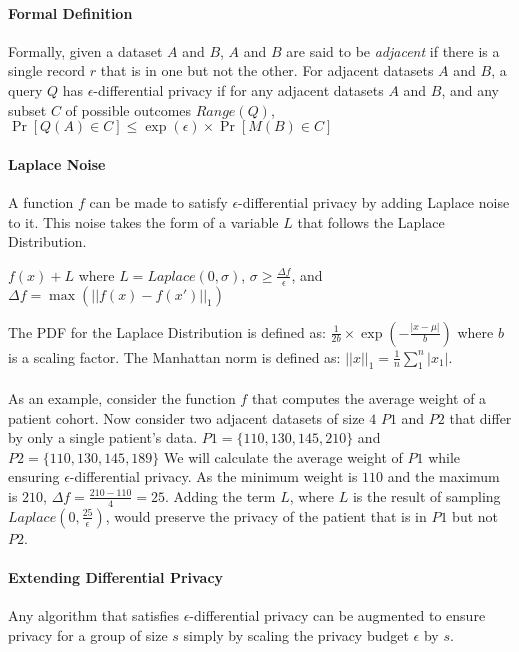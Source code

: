 \paragraph{Formal Definition}
Formally, given a dataset $A$ and $B$, $A$ and $B$ are said to be \textit{adjacent} if there is a single record $r$ that is in one but not the other. For adjacent datasets $A$ and $B$, a query $Q$ has $\epsilon$-differential privacy if for any adjacent datasets $A$ and $B$, and any subset $C$ of possible outcomes $Range(Q)$, $\Pr[Q(A) \in C] \leq \exp(\epsilon) \times \Pr[M(B) \in C]$

\paragraph{Laplace Noise}
A function $f$ can be made to satisfy $\epsilon$-differential privacy by adding Laplace noise to it. This noise takes the form of a variable $L$ that follows the Laplace Distribution. 

\bigbreak
\centerline{$f(x) + L$ where $L = Laplace(0, \sigma)$, $\sigma \geq \frac{\Delta f}{\epsilon}$, and $\Delta f = \max(||f(x) - f(x')||_1)$}
\bigbreak

The PDF for the Laplace Distribution is defined as: $\frac{1}{2b} \times \exp(-\frac{|x - \mu|}{b})$ where $b$ is a scaling factor. The Manhattan norm is defined as: $||x||_1 = \frac{1}{n} \sum_1^n |x_1|$.

\paragraph{}
As an example, consider the function $f$ that computes the average weight of a patient cohort. Now consider two adjacent datasets of size $4$ $P1$ and $P2$ that differ by only a single patient's data. $P1 = \{110, 130, 145, 210\}$ and $P2 = \{110, 130, 145, 189\}$ We will calculate the average weight of $P1$ while ensuring $\epsilon$-differential privacy. As the minimum weight is $110$ and the maximum is $210$, $\Delta f = \frac{210 - 110}{4} = 25$. Adding the term $L$, where $L$ is the result of sampling $Laplace(0, \frac{25}{\epsilon})$, would preserve the privacy of the patient that is in $P1$ but not $P2$.

\paragraph{Extending Differential Privacy}
Any algorithm that satisfies $\epsilon$-differential privacy can be augmented to ensure privacy for a group of size $s$ simply by scaling the privacy budget $\epsilon$ by $s$.

